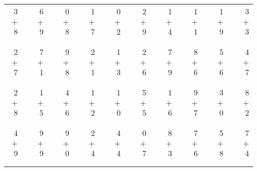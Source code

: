 \documentclass[12pt, letterpaper]{article}
\begin{document}
\begin{tabular}{rrrrrrrrrrrrrrrrrrr}
3 & & 6 & & 0 & & 1 & & 0 & & 2 & & 1 & & 1 & & 1 & & 3\\
$+$ 8 & & $+$ 9 & & $+$ 8 & & $+$ 7 & & $+$ 2 & & $+$ 9 & & $+$ 4 & & $+$ 1 & & $+$ 9 & & $+$ 3\\
\cline{1-1} \cline{3-3} \cline{5-5} \cline{7-7} \cline{9-9} \cline{11-11} \cline{13-13} \cline{15-15} \cline{17-17} \cline{19-19} \\ \\
2 & & 7 & & 9 & & 2 & & 1 & & 2 & & 7 & & 8 & & 5 & & 4\\
$+$ 7 & & $+$ 1 & & $+$ 8 & & $+$ 1 & & $+$ 3 & & $+$ 6 & & $+$ 9 & & $+$ 6 & & $+$ 6 & & $+$ 7\\
\cline{1-1} \cline{3-3} \cline{5-5} \cline{7-7} \cline{9-9} \cline{11-11} \cline{13-13} \cline{15-15} \cline{17-17} \cline{19-19} \\ \\
2 & & 1 & & 4 & & 1 & & 1 & & 5 & & 1 & & 9 & & 3 & & 8\\
$+$ 8 & & $+$ 5 & & $+$ 6 & & $+$ 2 & & $+$ 0 & & $+$ 5 & & $+$ 6 & & $+$ 7 & & $+$ 0 & & $+$ 2\\
\cline{1-1} \cline{3-3} \cline{5-5} \cline{7-7} \cline{9-9} \cline{11-11} \cline{13-13} \cline{15-15} \cline{17-17} \cline{19-19} \\ \\
4 & & 9 & & 9 & & 2 & & 4 & & 0 & & 8 & & 7 & & 5 & & 7\\
$+$ 9 & & $+$ 9 & & $+$ 0 & & $+$ 4 & & $+$ 4 & & $+$ 7 & & $+$ 3 & & $+$ 6 & & $+$ 8 & & $+$ 4\\
\cline{1-1} \cline{3-3} \cline{5-5} \cline{7-7} \cline{9-9} \cline{11-11} \cline{13-13} \cline{15-15} \cline{17-17} \cline{19-19} \\ \\
\end{tabular}
\newpage
\end{document}

